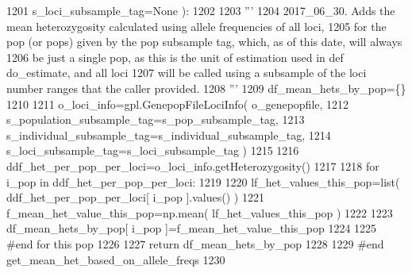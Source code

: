 \begin{DoxyCode}
1201                                                 s\_loci\_subsample\_tag=\textcolor{keywordtype}{None} ):
1202 
1203     \textcolor{stringliteral}{'''}
1204 \textcolor{stringliteral}{    2017\_06\_30.  Adds the mean heterozygosity calculated using allele frequencies of all loci,}
1205 \textcolor{stringliteral}{    for the pop (or pops) given by the pop subsample tag, which, as of this date, will always}
1206 \textcolor{stringliteral}{    be just a single pop, as this is the unit of estimation used in def do\_estimate, and all loci}
1207 \textcolor{stringliteral}{    will be called using a subsample of the loci number ranges that the caller provided.}
1208 \textcolor{stringliteral}{    '''}
1209     df\_mean\_hets\_by\_pop=\{\}
1210 
1211     o\_loci\_info=gpl.GenepopFileLociInfo( o\_genepopfile, 
1212                                             s\_population\_subsample\_tag=s\_pop\_subsample\_tag,
1213                                             s\_individual\_subsample\_tag=s\_individual\_subsample\_tag,
1214                                             s\_loci\_subsample\_tag=s\_loci\_subsample\_tag )
1215 
1216     ddf\_het\_per\_pop\_per\_loci=o\_loci\_info.getHeterozygosity()
1217 
1218     \textcolor{keywordflow}{for} i\_pop \textcolor{keywordflow}{in} ddf\_het\_per\_pop\_per\_loci:
1219 
1220         lf\_het\_values\_this\_pop=list( ddf\_het\_per\_pop\_per\_loci[ i\_pop ].values() )
1221         f\_mean\_het\_value\_this\_pop=np.mean( lf\_het\_values\_this\_pop )
1222 
1223         df\_mean\_hets\_by\_pop[ i\_pop ]=f\_mean\_het\_value\_this\_pop
1224         
1225     \textcolor{comment}{#end for this pop}
1226 
1227     \textcolor{keywordflow}{return} df\_mean\_hets\_by\_pop
1228 
1229 \textcolor{comment}{#end get\_mean\_het\_based\_on\_allele\_freqs}
1230 
\end{DoxyCode}
